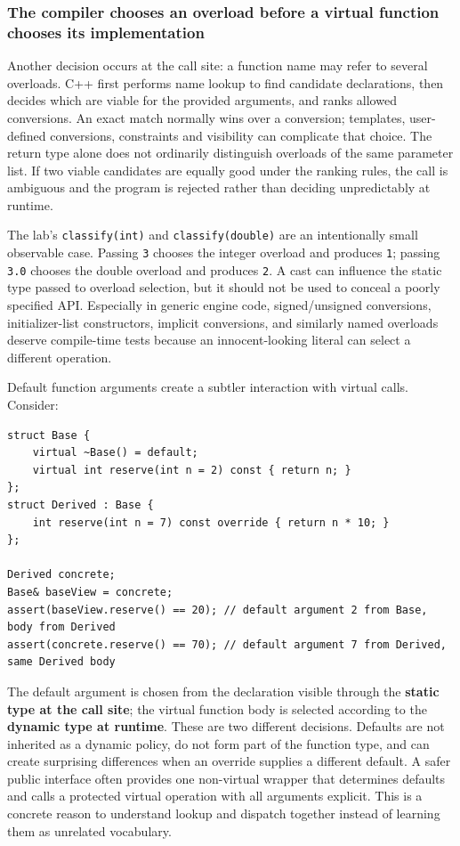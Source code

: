 \subsubsection{The compiler chooses an overload before a virtual function chooses its implementation}\label{the-compiler-chooses-an-overload-before-a-virtual-function-chooses-its-implementation}

Another decision occurs at the call site: a function name may refer to several overloads. C++ first performs name lookup to find candidate declarations, then decides which are viable for the provided arguments, and ranks allowed conversions. An exact match normally wins over a conversion; templates, user-defined conversions, constraints and visibility can complicate that choice. The return type alone does not ordinarily distinguish overloads of the same parameter list. If two viable candidates are equally good under the ranking rules, the call is ambiguous and the program is rejected rather than deciding unpredictably at runtime.

The lab's \texttt{classify(int)} and \texttt{classify(double)} are an intentionally small observable case. Passing \texttt{3} chooses the integer overload and produces \texttt{1}; passing \texttt{3.0} chooses the double overload and produces \texttt{2}. A cast can influence the static type passed to overload selection, but it should not be used to conceal a poorly specified API. Especially in generic engine code, signed/unsigned conversions, initializer-list constructors, implicit conversions, and similarly named overloads deserve compile-time tests because an innocent-looking literal can select a different operation.

Default function arguments create a subtler interaction with virtual calls. Consider:

\begin{verbatim}
struct Base {
    virtual ~Base() = default;
    virtual int reserve(int n = 2) const { return n; }
};
struct Derived : Base {
    int reserve(int n = 7) const override { return n * 10; }
};

Derived concrete;
Base& baseView = concrete;
assert(baseView.reserve() == 20); // default argument 2 from Base, body from Derived
assert(concrete.reserve() == 70); // default argument 7 from Derived, same Derived body
\end{verbatim}

The default argument is chosen from the declaration visible through the \textbf{static type at the call site}; the virtual function body is selected according to the \textbf{dynamic type at runtime}. These are two different decisions. Defaults are not inherited as a dynamic policy, do not form part of the function type, and can create surprising differences when an override supplies a different default. A safer public interface often provides one non-virtual wrapper that determines defaults and calls a protected virtual operation with all arguments explicit. This is a concrete reason to understand lookup and dispatch together instead of learning them as unrelated vocabulary.

